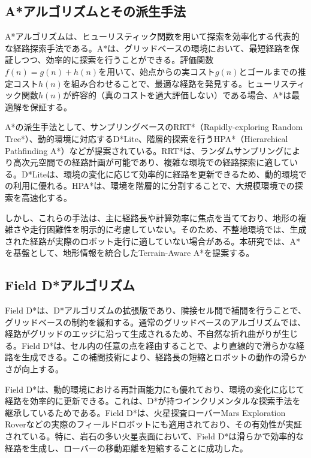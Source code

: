 \subsection{A*アルゴリズムとその派生手法}

A*アルゴリズムは、ヒューリスティック関数を用いて探索を効率化する代表的な経路探索手法である。A*は、グリッドベースの環境において、最短経路を保証しつつ、効率的に探索を行うことができる。評価関数$f(n) = g(n) + h(n)$を用いて、始点からの実コスト$g(n)$とゴールまでの推定コスト$h(n)$を組み合わせることで、最適な経路を発見する。ヒューリスティック関数$h(n)$が許容的（真のコストを過大評価しない）である場合、A*は最適解を保証する。

A*の派生手法として、サンプリングベースのRRT*（Rapidly-exploring Random Tree*）、動的環境に対応するD*Lite、階層的探索を行うHPA*（Hierarchical Pathfinding A*）などが提案されている。RRT*は、ランダムサンプリングにより高次元空間での経路計画が可能であり、複雑な環境での経路探索に適している。D*Liteは、環境の変化に応じて効率的に経路を更新できるため、動的環境での利用に優れる。HPA*は、環境を階層的に分割することで、大規模環境での探索を高速化する。

しかし、これらの手法は、主に経路長や計算効率に焦点を当てており、地形の複雑さや走行困難性を明示的に考慮していない。そのため、不整地環境では、生成された経路が実際のロボット走行に適していない場合がある。本研究では、A*を基盤として、地形情報を統合したTerrain-Aware A*を提案する。

\subsection{Field D*アルゴリズム}

Field D*は、D*アルゴリズムの拡張版であり、隣接セル間で補間を行うことで、グリッドベースの制約を緩和する。通常のグリッドベースのアルゴリズムでは、経路がグリッドのエッジに沿って生成されるため、不自然な折れ曲がりが生じる。Field D*は、セル内の任意の点を経由することで、より直線的で滑らかな経路を生成できる。この補間技術により、経路長の短縮とロボットの動作の滑らかさが向上する。

Field D*は、動的環境における再計画能力にも優れており、環境の変化に応じて経路を効率的に更新できる。これは、D*が持つインクリメンタルな探索手法を継承しているためである。Field D*は、火星探査ローバーMars Exploration Roverなどの実際のフィールドロボットにも適用されており、その有効性が実証されている。特に、岩石の多い火星表面において、Field D*は滑らかで効率的な経路を生成し、ローバーの移動距離を短縮することに成功した。

